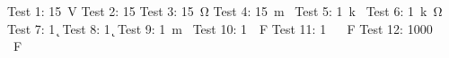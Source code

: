 \documentclass{article}
\begin{document}
Test 1: \SI{15}{V} \n
Test 2: \SI{15}{\Omega} \n
Test 3: \SI{15}{\ohm} \n
Test 4: \SI{15}{\m\Omega} \n
Test 5: \SI{1}{k\Omega} \n
Test 6: \SI{1}{k\ohm} \n
Test 7: \SI{1}{\k\Omega} \n
Test 8: \SI{1}{\k\ohm} \n
Test 9: \SI{1}{\m\Omega} \n
Test 10: \SI{1}{\mu F} \n
Test 11: \SI{1}{\mu\,F} \n
Test 12: \SI{1000}{\mu\,F} \n
\end{document}
